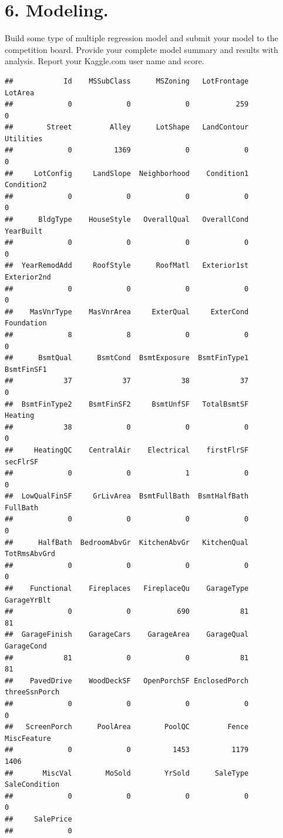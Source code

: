 \documentclass[]{article}
\begin{document}
\hypertarget{modeling.}{%
\section{6. Modeling.}\label{modeling.}}

Build some type of multiple regression model and submit your model to
the competition board. Provide your complete model summary and results
with analysis. Report your Kaggle.com user name and score.

\begin{verbatim}
##            Id    MSSubClass      MSZoning   LotFrontage       LotArea 
##             0             0             0           259             0 
##        Street         Alley      LotShape   LandContour     Utilities 
##             0          1369             0             0             0 
##     LotConfig     LandSlope  Neighborhood    Condition1    Condition2 
##             0             0             0             0             0 
##      BldgType    HouseStyle   OverallQual   OverallCond     YearBuilt 
##             0             0             0             0             0 
##  YearRemodAdd     RoofStyle      RoofMatl   Exterior1st   Exterior2nd 
##             0             0             0             0             0 
##    MasVnrType    MasVnrArea     ExterQual     ExterCond    Foundation 
##             8             8             0             0             0 
##      BsmtQual      BsmtCond  BsmtExposure  BsmtFinType1    BsmtFinSF1 
##            37            37            38            37             0 
##  BsmtFinType2    BsmtFinSF2     BsmtUnfSF   TotalBsmtSF       Heating 
##            38             0             0             0             0 
##     HeatingQC    CentralAir    Electrical    firstFlrSF      secFlrSF 
##             0             0             1             0             0 
##  LowQualFinSF     GrLivArea  BsmtFullBath  BsmtHalfBath      FullBath 
##             0             0             0             0             0 
##      HalfBath  BedroomAbvGr  KitchenAbvGr   KitchenQual  TotRmsAbvGrd 
##             0             0             0             0             0 
##    Functional    Fireplaces   FireplaceQu    GarageType   GarageYrBlt 
##             0             0           690            81            81 
##  GarageFinish    GarageCars    GarageArea    GarageQual    GarageCond 
##            81             0             0            81            81 
##    PavedDrive    WoodDeckSF   OpenPorchSF EnclosedPorch threeSsnPorch 
##             0             0             0             0             0 
##   ScreenPorch      PoolArea        PoolQC         Fence   MiscFeature 
##             0             0          1453          1179          1406 
##       MiscVal        MoSold        YrSold      SaleType SaleCondition 
##             0             0             0             0             0 
##     SalePrice 
##             0
\end{verbatim}
\end{document}
